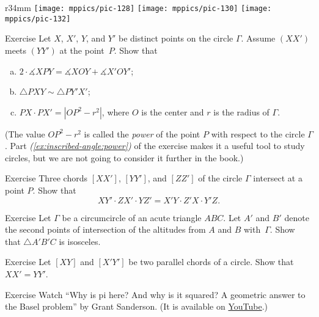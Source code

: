 {

\begin{wrapfigure}{r}{34mm}
\centering
\texttt{[image: mppics/pic-128]}
\vskip3mm
\texttt{[image: mppics/pic-130]}
\vskip3mm
\texttt{[image: mppics/pic-132]}
\end{wrapfigure}

\begin{thm}{Exercise}\label{ex:inscribed-angle}
Let $X$, $X'$, $Y$, and $Y'$ be distinct points on the circle $\Gamma$.
Assume $(XX')$ meets $(YY')$ at the point~$P$.
Show that 
\begin{enumerate}[(a)]
\item $2\cdot \measuredangle XPY=\measuredangle XOY+\measuredangle X'OY'$;
\item\label{ex:inscribed-angle:b} $\triangle PXY\sim \triangle PY'X'$;
\item\label{ex:inscribed-angle:power} $PX\cdot PX'=|OP^2-r^2|$, where $O$ is the center and $r$ is the radius of $\Gamma$.
\end{enumerate}

\end{thm}

(The value $OP^2-r^2$ is called the \emph{power} of the point $P$ with respect to the circle $\Gamma$. 
Part \textit{(\ref{ex:inscribed-angle:power})} of the exercise makes it a useful tool to study circles, but we are not going to consider it further in the book.) 

\begin{thm}{Exercise}\label{ex:inscribed-hex}
Three chords $[XX']$, $[YY']$, and $[ZZ']$
of the circle $\Gamma$ intersect at a point $P$.
Show that 
$$XY'\cdot ZX'\cdot YZ'=X'Y\cdot Z'X\cdot Y'Z.$$

\end{thm}

\begin{thm}{Exercise}\label{ex:altitudes-circumcircle}
Let $\Gamma$ be a circumcircle of an acute triangle $A B C$.
Let $A'$ and $B'$ denote the second points of intersection of the altitudes from $A$ and $B$ with~$\Gamma$.
Show that $\triangle A' B' C$ is isosceles.
\end{thm}

}

\begin{thm}{Exercise}\label{ex:two-chords}
Let $[XY]$ and $[X'Y']$
 be two parallel chords of a circle.
Show that $XX'=YY'$.
\end{thm}

\begin{thm}{Exercise}
Watch ``Why is pi here? And why is it squared? A geometric answer to the Basel problem'' by Grant Sanderson. (It is available on \href{https://youtu.be/d-o3eB9sfls}{YouTube}.) 
\end{thm}

